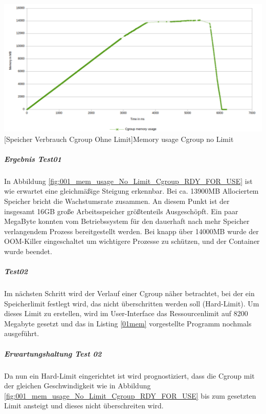 \vspace{1em}
\begin{minipage}{\linewidth}
	\centering
	\includegraphics[width=1\linewidth]{pics/001_mem_usage_No_Limit_Cgroup_RDY_FOR_USE.png}
	[Speicher Verbrauch Cgroup Ohne Limit]{Memory usage Cgroup no Limit}
	\label{fig:001_mem_usage_No_Limit_Cgroup_RDY_FOR_USE}
\end{minipage}

\subparagraph{Ergebnis Test01}
In Abbildung \ref{fig:001_mem_usage_No_Limit_Cgroup_RDY_FOR_USE} ist wie erwartet eine gleichmäßige Steigung erkennbar. Bei ca. 13900MB Allociertem Speicher bricht die Wachstumsrate zusammen. An diesem Punkt ist der insgesamt 16GB große Arbeitsspeicher größtenteils Ausgeschöpft. Ein paar MegaByte konnten vom Betriebssystem für den dauerhaft nach mehr Speicher verlangendem Prozess bereitgestellt werden. Bei knapp über 14000MB wurde der OOM-Killer eingeschaltet um wichtigere Prozesse zu schützen, und der Container wurde beendet.

\subparagraph{Test02}
Im nächsten Schritt wird der Verlauf einer Cgroup näher betrachtet, bei der ein Speicherlimit festlegt wird, das nicht überschritten werden soll (Hard-Limit). Um dieses Limit zu erstellen, wird im User-Interface  das Ressourcenlimit auf 8200 Megabyte gesetzt und das in Listing \ref{01mem} vorgestellte Programm nochmals ausgeführt.

\subparagraph{Erwartungshaltung Test 02}
Da nun ein Hard-Limit eingerichtet ist wird prognostiziert, dass die Cgroup mit der gleichen Geschwindigkeit wie in Abbildung \ref{fig:001_mem_usage_No_Limit_Cgroup_RDY_FOR_USE} bis zum gesetzten Limit ansteigt und dieses nicht überschreiten wird. 

